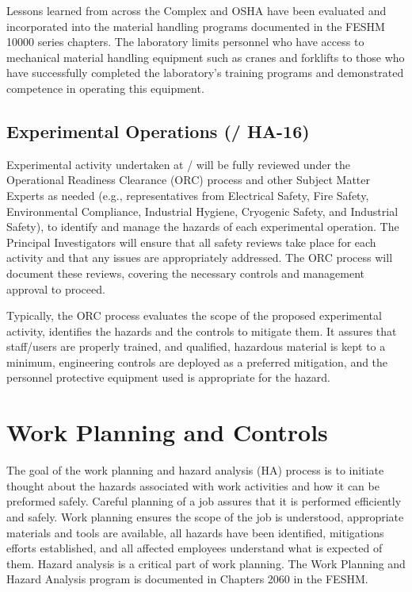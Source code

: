 Lessons learned from across the  Complex and OSHA have been
evaluated and incorporated into the \fnal material handling
programs documented in the FESHM 10000 series chapters.  The
laboratory limits personnel who have access to mechanical material
handling equipment such as cranes and forklifts to those who have
successfully completed the laboratory's training programs and
demonstrated competence in operating this equipment.


\subsection{Experimental Operations (/ HA-16)}

Experimental activity undertaken at / will be fully reviewed
under the Operational Readiness Clearance (ORC) process and other
Subject Matter Experts as needed (e.g., representatives from
Electrical Safety, Fire Safety, Environmental Compliance, Industrial
Hygiene, Cryogenic Safety, and Industrial Safety), to identify and
manage the hazards of each experimental operation. The Principal
Investigators will ensure that all safety reviews take place for each
activity and that any issues are appropriately addressed. The ORC
process will document these reviews, covering the necessary controls
and management approval to proceed.

Typically, the ORC process evaluates the scope of the proposed
experimental activity, identifies the hazards and the controls to
mitigate them. It assures that staff/users are properly trained, and
qualified, hazardous material is kept to a minimum, engineering
controls are deployed as a preferred mitigation, and the personnel
protective equipment used is appropriate for the hazard.

\section{Work Planning and Controls}

The goal of the work planning and hazard analysis (HA) process is to
initiate thought about the hazards associated with work activities and
how it can be preformed safely. Careful planning of a job assures that
it is performed efficiently and safely. Work planning ensures the
scope of the job is understood, appropriate materials and tools are
available, all hazards have been identified, mitigations efforts
established, and all affected employees understand what is expected of
them. Hazard analysis is a critical part of work planning.  The Work
Planning and Hazard Analysis program is documented in Chapters 2060 in
the FESHM.

